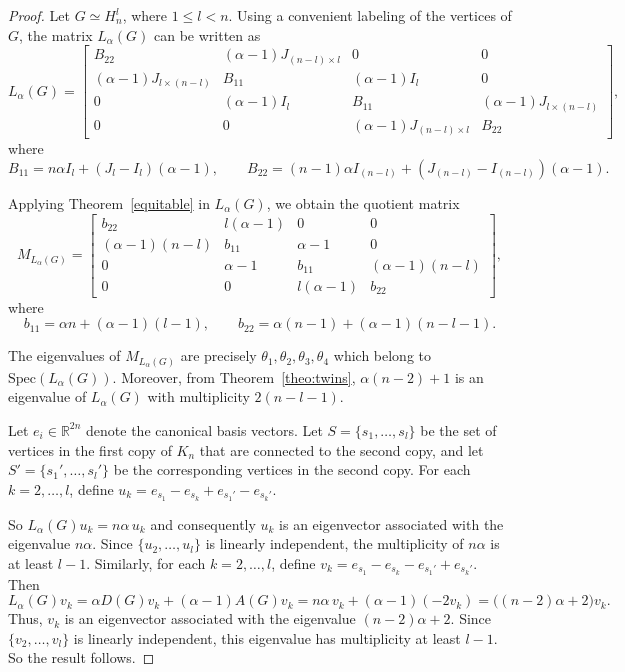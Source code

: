 \documentclass{article}
\begin{document}
\begin{proof}
Let $G \simeq H_n^l$, where $1 \leq l < n$. Using a convenient labeling of the vertices of $G$, the matrix $L_\alpha(G)$ can be written as
\[
L_\alpha(G)=
\begin{bmatrix}
B_{22} & (\alpha-1)J_{(n-l)\times l} & 0 & 0\\[4pt]
(\alpha-1)J_{l\times(n-l)} & B_{11} & (\alpha-1)I_l & 0\\[4pt]
0 & (\alpha-1)I_l & B_{11} & (\alpha-1)J_{l\times(n-l)}\\[4pt]
0 & 0 & (\alpha-1)J_{(n-l)\times l} & B_{22}
\end{bmatrix},
\]
where
\[
B_{11}=n\alpha I_l+(J_l-I_l)(\alpha-1),
\qquad
B_{22}=(n-1)\alpha I_{(n-l)}+(J_{(n-l)}-I_{(n-l)})(\alpha-1).
\]

Applying Theorem~\ref{equitable} in $L_\alpha(G)$, we obtain the quotient matrix
\[
M_{L_\alpha(G)}=
\begin{bmatrix}
b_{22} & l(\alpha-1) & 0 & 0\\[4pt]
(\alpha-1)(n-l) & b_{11} & \alpha-1 & 0\\[4pt]
0 & \alpha-1 & b_{11} & (\alpha-1)(n-l)\\[4pt]
0 & 0 & l(\alpha-1) & b_{22}
\end{bmatrix},
\]
where
\[
b_{11}=\alpha n+(\alpha-1)(l-1),
\qquad
b_{22}=\alpha(n-1)+(\alpha-1)(n-l-1).
\]

The eigenvalues of $M_{L_\alpha(G)}$ are precisely $\theta_1,\theta_2,\theta_3,\theta_4$ which belong to $\mathrm{Spec}(L_\alpha(G))$. Moreover, from Theorem~\ref{theo:twins}, $\alpha(n-2)+1$ is an eigenvalue of $L_\alpha(G)$ with multiplicity $2(n-l-1)$.

Let $e_i \in \mathbb{R}^{2n}$ denote the canonical basis vectors. Let $S=\{s_1,\dots,s_l\}$ be the set of vertices in the first copy of $K_n$ that are connected to the second copy, and let $S' = \{s_1',\dots,s_l'\}$ be the corresponding vertices in the second copy. For each $k=2,\dots,l$, define $u_k = e_{s_1}-e_{s_k} + e_{s_1'}-e_{s_k'}.$ 

So
$
L_\alpha(G)u_k = n\alpha\,u_k
$
and consequently $u_k$ is an eigenvector associated with the eigenvalue $n\alpha$. Since $\{u_2,\dots,u_l\}$ is linearly independent, the multiplicity of $n\alpha$ is at least $l-1$. Similarly, for each $k=2,\dots,l$, define $
v_k = e_{s_1}-e_{s_k}-e_{s_1'}+e_{s_k'}.$ Then
\[
L_\alpha(G)v_k
= \alpha D(G)v_k + (\alpha-1)A(G)v_k
= n\alpha\,v_k + (\alpha-1)(-2v_k)
= \bigl((n-2)\alpha+2\bigr)v_k.
\]
Thus, $v_k$ is an eigenvector associated with the eigenvalue $(n-2)\alpha+2$. Since $\{v_2,\dots,v_l\}$ is linearly independent, this eigenvalue has multiplicity at least $l-1$. So the result follows.
\end{proof}
\end{document}
